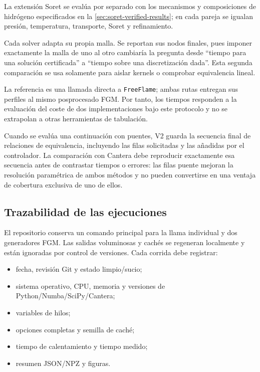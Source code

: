 \documentclass[12pt,a4paper,twoside,openany]{book}
\newcommand{\codigo}[1]{\texttt{#1}}
\begin{document}
La extensión Soret se evalúa por separado con los mecanismos y composiciones
de hidrógeno especificados en la \cref{sec:soret-verified-results}; en cada
pareja se igualan presión, temperatura, transporte, Soret y refinamiento.

Cada solver adapta su propia malla. Se reportan sus nodos finales, pues imponer
exactamente la malla de uno al otro cambiaría la pregunta desde ``tiempo para una
solución certificada'' a ``tiempo sobre una discretización dada''. Esta segunda
comparación se usa solamente para aislar kernels o comprobar equivalencia
lineal.

La referencia es una llamada directa a \codigo{FreeFlame}; ambas rutas entregan
sus perfiles al mismo posprocesado FGM. Por tanto, los tiempos responden a la
evaluación del coste de dos implementaciones bajo este protocolo y no se
extrapolan a otras herramientas de tabulación.

Cuando se evalúa una continuación con puentes, V2 guarda la secuencia final de
relaciones de equivalencia, incluyendo las filas solicitadas y las añadidas por
el controlador. La comparación con Cantera debe reproducir exactamente esa
secuencia antes de contrastar tiempos o errores: las filas puente mejoran la
resolución paramétrica de ambos métodos y no pueden convertirse en una ventaja
de cobertura exclusiva de uno de ellos.

\subsection{Trazabilidad de las ejecuciones}

El repositorio conserva un comando principal para la llama individual y dos
generadores FGM. Las salidas voluminosas y cachés se regeneran localmente y están
ignoradas por control de versiones. Cada corrida debe registrar:

\begin{itemize}
  \item fecha, revisión Git y estado limpio/sucio;
  \item sistema operativo, CPU, memoria y versiones de Python/Numba/SciPy/Cantera;
  \item variables de hilos;
  \item opciones completas y semilla de caché;
  \item tiempo de calentamiento y tiempo medido;
  \item resumen JSON/NPZ y figuras.
\end{itemize}
\end{document}
